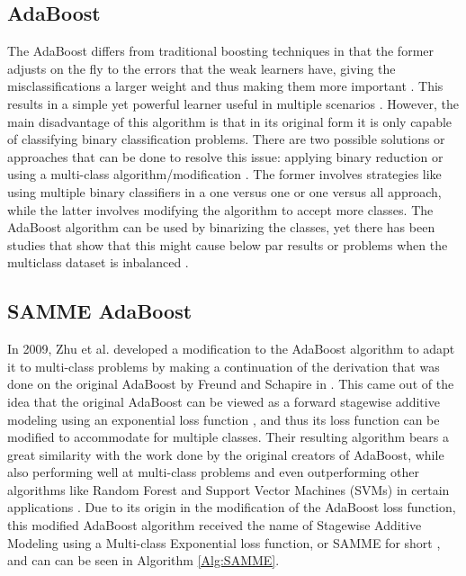 \documentclass{article}
\begin{document}
\subsection{AdaBoost}
The AdaBoost differs from traditional boosting techniques in that the former adjusts on the fly to the errors that the weak learners have, giving the misclassifications a larger weight and thus making them more important \cite{Schapire_explaining_adaboost, Freund_adaboost}. This results in a simple yet powerful learner useful in multiple scenarios \cite{Schapire_explaining_adaboost}. However, the main disadvantage of this algorithm is that in its original form it is only capable of classifying binary classification problems. There are two possible solutions or approaches that can be done to resolve this issue: applying binary reduction or using a multi-class algorithm/modification \cite{Saberian_binarization_problems, Zhai_multiclass_boosting}. The former involves strategies like using multiple binary classifiers in a one versus one or one versus all approach, while the latter involves modifying the algorithm to accept more classes. The AdaBoost algorithm can be used by binarizing the classes, yet there has been studies that show that this might cause below par results or problems when the multiclass dataset is inbalanced \cite{Saberian_binarization_problems, Sun_boosting_imbalanced_data}.

\subsection{SAMME AdaBoost}
In 2009, Zhu et al. developed a modification to the AdaBoost algorithm to adapt it to multi-class problems \cite{multi_class_adaboost} by making a continuation of the derivation that was done on the original AdaBoost by Freund and Schapire in \cite{Freund_adaboost}. This came out of the idea that the original AdaBoost can be viewed as a forward stagewise additive modeling using an exponential loss function \cite{adaboost_forward_stagewise_additive}, and thus its loss function can be modified to accommodate for multiple classes. Their resulting algorithm bears a great similarity with the work done by the original creators of AdaBoost, while also performing well at multi-class problems \cite{multi_class_adaboost} and even outperforming other algorithms like Random Forest and Support Vector Machines (SVMs) in certain applications \cite{random_forests_vs_SAMME, random_forests_vs_SVM, SAMME_inbalancedData}. Due to its origin in the modification of the AdaBoost loss function, this modified AdaBoost algorithm received the name of Stagewise Additive Modeling using a Multi-class Exponential loss function, or SAMME for short \cite{multi_class_adaboost}, and can can be seen in Algorithm \ref{Alg:SAMME}.
\end{document}
